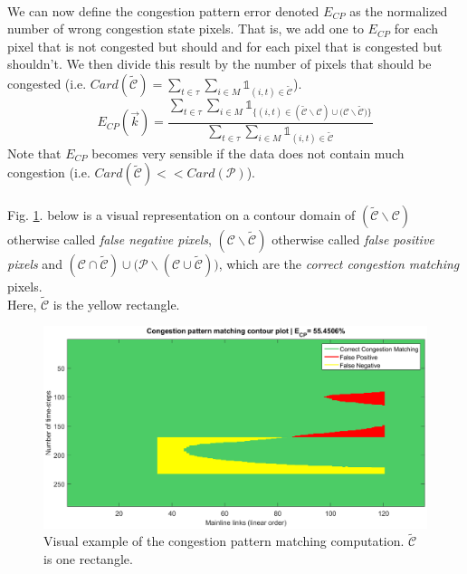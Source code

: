 \\
We can now define the congestion pattern error denoted $E_{CP}$ as the normalized number of wrong congestion state pixels. That is, we add one to $E_{CP}$ for each pixel that is not congested but should and for each pixel that is congested but shouldn't. We then divide this result by the number of pixels that should be congested (i.e. $Card(\widetilde{\mathscr{C}})=\sum_{t\in{\tau}}\sum_{i\in{M}}\mathds{1}_{(i,t)\in{\widetilde{\mathscr{C}}}}$).
\begin{equation*}
	E_{CP}(\vec{k})=\frac{\sum_{t\in{\tau}}\sum_{i\in{M}}\mathds{1}_{\{(i,t)\in{(\widetilde{\mathscr{C}}\backslash \mathscr{C})\cup(\mathscr{C}\backslash \widetilde{\mathscr{C}} })\}}}{\sum_{t\in{\tau}}\sum_{i\in{M}}\mathds{1}_{(i,t)\in{\widetilde{\mathscr{C}}}}}
\end{equation*}
Note that $E_{CP}$ becomes very sensible if the data does not contain much congestion (i.e. $Card(\widetilde{\mathscr{C}})<<Card(\mathscr{P})$).\\
\\
Fig. \ref{fig:cp_example}. below is a visual representation on a contour domain of $(\widetilde{\mathscr{C}}\backslash \mathscr{C})$ otherwise called \emph{false negative pixels}, $(\mathscr{C}\backslash\widetilde{\mathscr{C}})$ otherwise called \emph{false positive pixels} and $(\mathscr{C}\cap\widetilde{\mathscr{C}})\cup \big(\mathscr{P}\backslash(\mathscr{C}\cup \widetilde{\mathscr{C}})\big)$, which are the \emph{correct congestion matching} pixels. 
\\Here, $\widetilde{\mathscr{C}}$ is the yellow rectangle.
\begin{figure}[h!]
 	\centering
	\caption{Visual example of the congestion pattern matching computation. $\widetilde{\mathscr{C}}$ is one rectangle.}
	\label{fig:cp_example}
	\includegraphics[width=7in]{figures/cp_example.png}
\end{figure}

